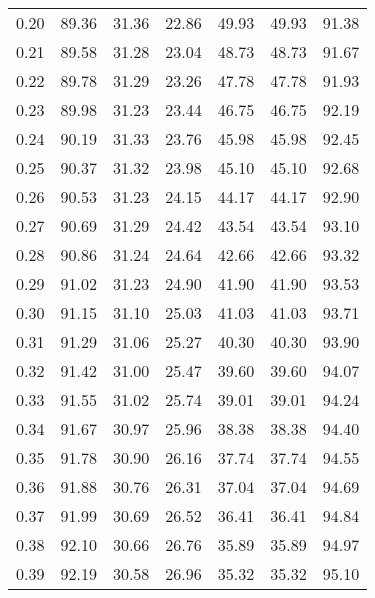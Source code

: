 \begin{tabular}{|c|c|c|c|c|c|c|}
      0.20 &     89.36 &     31.36 &      22.86 &   49.93 &      49.93 &         91.38 \\
      0.21 &     89.58 &     31.28 &      23.04 &   48.73 &      48.73 &         91.67 \\
      0.22 &     89.78 &     31.29 &      23.26 &   47.78 &      47.78 &         91.93 \\
      0.23 &     89.98 &     31.23 &      23.44 &   46.75 &      46.75 &         92.19 \\
      0.24 &     90.19 &     31.33 &      23.76 &   45.98 &      45.98 &         92.45 \\
      0.25 &     90.37 &     31.32 &      23.98 &   45.10 &      45.10 &         92.68 \\
      0.26 &     90.53 &     31.23 &      24.15 &   44.17 &      44.17 &         92.90 \\
      0.27 &     90.69 &     31.29 &      24.42 &   43.54 &      43.54 &         93.10 \\
      0.28 &     90.86 &     31.24 &      24.64 &   42.66 &      42.66 &         93.32 \\
      0.29 &     91.02 &     31.23 &      24.90 &   41.90 &      41.90 &         93.53 \\
      0.30 &     91.15 &     31.10 &      25.03 &   41.03 &      41.03 &         93.71 \\
      0.31 &     91.29 &     31.06 &      25.27 &   40.30 &      40.30 &         93.90 \\
      0.32 &     91.42 &     31.00 &      25.47 &   39.60 &      39.60 &         94.07 \\
      0.33 &     91.55 &     31.02 &      25.74 &   39.01 &      39.01 &         94.24 \\
      0.34 &     91.67 &     30.97 &      25.96 &   38.38 &      38.38 &         94.40 \\
      0.35 &     91.78 &     30.90 &      26.16 &   37.74 &      37.74 &         94.55 \\
      0.36 &     91.88 &     30.76 &      26.31 &   37.04 &      37.04 &         94.69 \\
      0.37 &     91.99 &     30.69 &      26.52 &   36.41 &      36.41 &         94.84 \\
      0.38 &     92.10 &     30.66 &      26.76 &   35.89 &      35.89 &         94.97 \\
      0.39 &     92.19 &     30.58 &      26.96 &   35.32 &      35.32 &         95.10 \\

\end{tabular}
